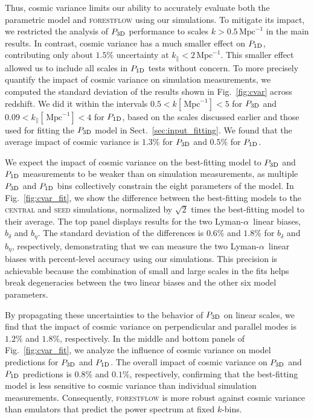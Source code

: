 \documentclass[longauth]{aa}
\newcommand{\lya}{Lyman-$\alpha$\xspace}
\newcommand{\poned}{\ensuremath{P_{\rm 1D}}\xspace}
\newcommand{\pthreed}{\ensuremath{P_{\rm 3D}}\xspace}
\newcommand{\forestflow}{\textsc{forestflow}\xspace}
\newcommand{\simseed}{\textsc{seed}\xspace}
\newcommand{\simcentral}{\textsc{central}\xspace}
\newcommand{\iMpc}{\ensuremath{\,\mathrm{Mpc}^{-1}}}
\begin{document}
\begin{appendix}
Thus, cosmic variance limits our ability to accurately evaluate both the parametric model and \forestflow using our simulations. To mitigate its impact, we restricted the analysis of \pthreed performance to scales $k > 0.5\iMpc$ in the main results. In contrast, cosmic variance has a much smaller effect on \poned, contributing only about $1.5\%$ uncertainty at $k_\parallel < 2\iMpc$. This smaller effect allowed us to include all scales in \poned tests without concern. To more precisely quantify the impact of cosmic variance on simulation measurements, we computed the standard deviation of the results shown in Fig.~\ref{fig:cvar} across redshift. We did it within the intervals $0.5 < k[\iMpc] < 5$ for \pthreed and $0.09 < k_\parallel[\iMpc] < 4$ for \poned, based on the scales discussed earlier and those used for fitting the \pthreed model in Sect.~\ref{sec:input_fitting}. We found that the average impact of cosmic variance is $1.3\%$ for \pthreed and $0.5\%$ for \poned.

We expect the impact of cosmic variance on the best-fitting model to \pthreed and \poned measurements to be weaker than on simulation measurements, as multiple \pthreed and \poned bins collectively constrain the eight parameters of the model. In Fig.~\ref{fig:cvar_fit}, we show the difference between the best-fitting models to the \simcentral and \simseed simulations, normalized by $\sqrt{2}$ times the best-fitting model to their average. The top panel displays results for the two \lya\ linear biases, $b_\delta$ and $b_\eta$. The standard deviation of the differences is $0.6\%$ and $1.8\%$ for $b_\delta$ and $b_\eta$, respectively, demonstrating that we can measure the two \lya\ linear biases with percent-level accuracy using our simulations. This precision is achievable because the combination of small and large scales in the fits helps break degeneracies between the two linear biases and the other six model parameters. 

By propagating these uncertainties to the behavior of \pthreed on linear scales, we find that the impact of cosmic variance on perpendicular and parallel modes is $1.2\%$ and $1.8\%$, respectively. In the middle and bottom panels of Fig.~\ref{fig:cvar_fit}, we analyze the influence of cosmic variance on model predictions for \pthreed and \poned. The overall impact of cosmic variance on \pthreed and \poned predictions is $0.8\%$ and $0.1\%$, respectively, confirming that the best-fitting model is less sensitive to cosmic variance than individual simulation measurements. Consequently, \forestflow is more robust against cosmic variance than emulators that predict the power spectrum at fixed $k$-bins.




\end{appendix}
\end{document}
